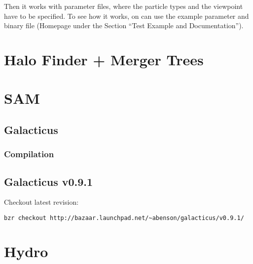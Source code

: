 \documentclass[a4paper,english,10.5pt]{scrartcl}
\begin{document}
Then it works with parameter files, where the particle types and the viewpoint have to be specified. To see how it works, on can use
the example parameter and binary file (Homepage under the Section ``Test Example and Documentation'').

\section{Halo Finder + Merger Trees}

\section{SAM}
\subsection{Galacticus}
\subsubsection{Compilation}


\subsection{Galacticus v0.9.1}

Checkout latest revision: 
\begin{verbatim}
bzr checkout http://bazaar.launchpad.net/~abenson/galacticus/v0.9.1/
\end{verbatim}

\section{Hydro}


\renewcommand{\bibsection}{\section{References}}
\setlength{\bibhang}{1.24cm}
\setlength{\parindent}{3cm}
\setlength{\bibsep}{0cm}

\gdef\harvardand{\&}
\end{document}
